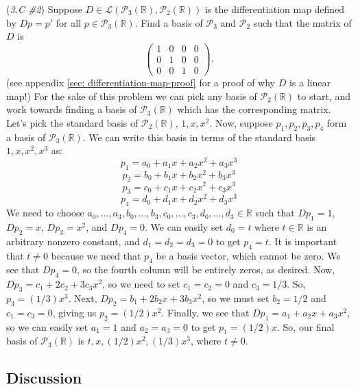 \documentclass{article}
\renewcommand{\L}{\mathcal{L}}
\newcommand{\R}{\mathbb{R}}
\theoremstyle{definition}
\begin{document}
\begin{problem}{(\textit{3.C \#2}) Suppose $D \in \L(\mathcal{P}_3(\R), \mathcal{P}_2(\R))$ is the differentiation map defined by $Dp = p'$ for all $p \in \mathcal{P}_3(\R)$. Find a basis of $\mathcal{P}_3$ and $\mathcal{P}_2$ such that the matrix of $D$ is $$\begin{pmatrix}
    1 & 0 & 0 & 0 \\
    0 & 1 & 0 & 0 \\
    0 & 0 & 1 & 0
\end{pmatrix}.$$ (see appendix \ref{sec: differentiation-map-proof} for a proof of why $D$ is a linear map!)}
    For the sake of this problem we can pick any basis of $\mathcal{P}_2(\R)$ to start, and work towards finding a basis of $\mathcal{P}_3(\R)$ which has the corresponding matrix. Let's pick the standard basis of $\mathcal{P}_2(\R)$, $1, x, x^2$. Now, suppose $p_1, p_2, p_3, p_4$ form a basis of $\mathcal{P}_3(\R)$. We can write this basis in terms of the standard basis $1, x, x^2, x^3$ as:
    $$p_1 = a_0 + a_1x + a_2x^2 + a_3x^3$$
    $$p_2 = b_0 + b_1x + b_2x^2 + b_3x^3$$
    $$p_3 = c_0 + c_1x + c_2x^2 + c_3x^3$$
    $$p_4 = d_0 + d_1x + d_2x^2 + d_3x^3$$
    We need to choose $a_0, \dots, a_3, b_0, \dots, b_3, c_0, \dots, c_3, d_0, \dots, d_3 \in \R$ such that $Dp_1 = 1$, $Dp_2 = x$, $Dp_3 = x^2$, and $Dp_4 = 0$. We can easily set $d_0 = t$ where $t \in \R$ is an arbitrary nonzero constant, and $d_1 = d_2 = d_3 = 0$ to get $p_4 = t$. It is important that $t \neq 0$ because we need that $p_4$ be a basis vector, which cannot be zero. We see that $Dp_4 = 0$, so the fourth column will be entirely zeros, as desired. Now, $Dp_3 = c_1 + 2c_2 + 3c_3x^2$, so we need to set $c_1 = c_2 = 0$ and $c_3 = 1/3$. So, $p_3 = (1/3)x^3$. Next, $Dp_2 = b_1 + 2b_2x + 3b_3x^2$, so we must set $b_2 = 1/2$ and $c_1 = c_3 = 0$, giving us $p_2 = (1/2)x^2$. Finally,  we see that $Dp_1 = a_1 + a_2x + a_3x^2$, so we can easily set $a_1 = 1$ and $a_2 = a_3 = 0$ to get $p_1 = (1/2)x$. So, our final basis of $\mathcal{P}_3(\R)$ is $t, x, (1/2)x^2, (1/3)x^3$, where $t \neq 0$.
\end{problem}

\subsection{Discussion}
\end{document}
